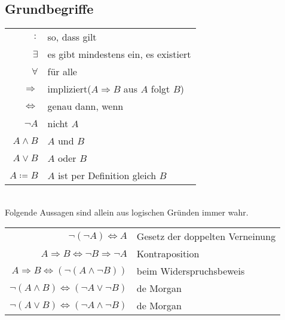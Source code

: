 \documentclass[../ana1.tex]{subfiles}
\begin{document}
\subsection{Grundbegriffe}
\begin{notation}\leavevmode
	\begin{center}
		\begin{tabular}{r|l}
			\(\colon\)               & \glqq so, dass gilt\grqq                                                    \\
			\(\exists\)         & \glqq es gibt mindestens ein\grqq , \glqq es existiert\grqq                 \\
			\(\forall\)         & \glqq für alle\grqq                                                         \\
			\(\Rightarrow\)     & \glqq impliziert\grqq(\(A \Rightarrow B\) \glqq aus \(A\) folgt \(B\)\grqq) \\
			\(\Leftrightarrow\) & \glqq genau dann, wenn\grqq                                                 \\
			\(\neg A\)          & nicht \(A\)                                                                 \\
			\(A \wedge B\)      & \(A\) und \(B\)                                                             \\
			\(A \vee B\)        & \(A\) oder \(B\)                                                            \\
			\(A \coloneqq B\)          & \(A\) ist per Definition gleich \(B\)
		\end{tabular}
	\end{center}
\end{notation}

\begin{satz}
	\\Folgende Aussagen sind allein aus logischen Gründen immer wahr.
	\begin{center}
		\begin{tabular}{rl}
			\(\neg(\neg A) \Leftrightarrow A\)                            & Gesetz der doppelten Verneinung \\
			\(A \Rightarrow B \Leftrightarrow \neg B \Rightarrow \neg A\) & Kontraposition                  \\
			\(A \Rightarrow B \Leftrightarrow (\neg (A \wedge \neg B))\)  & beim Widerspruchsbeweis         \\
			\(\neg(A \wedge B) \Leftrightarrow (\neg A \vee \neg B)\)     & de Morgan                       \\
			\(\neg(A \vee B) \Leftrightarrow (\neg A \wedge \neg B)\)     & de Morgan                       \\
		\end{tabular}
	\end{center}
\end{satz}
\end{document}
